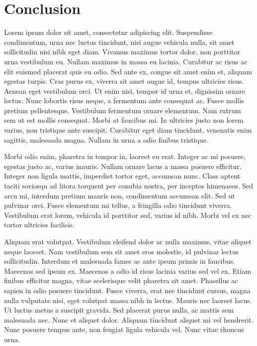 \documentclass[twocolumn]{article}
\begin{document}
	\section{Conclusion}
	
	
	Lorem ipsum dolor sit amet, consectetur adipiscing elit. Suspendisse condimentum, urna nec luctus tincidunt, nisi augue vehicula nulla, sit amet sollicitudin nisi nibh eget diam. Vivamus maximus tortor dolor, non porttitor urna vestibulum eu. Nullam maximus in massa eu lacinia. Curabitur ac risus ac elit euismod placerat quis eu odio. Sed ante ex, congue sit amet enim et, aliquam egestas turpis. Cras purus ex, viverra sit amet augue id, tempus ultricies risus. Aenean eget vestibulum orci. Ut enim nisi, tempor id urna et, dignissim ornare lectus. Nunc lobortis risus neque, a fermentum ante consequat ac. Fusce mollis pretium pellentesque. Vestibulum fermentum ornare elementum. Nam rutrum sem ut est mollis consequat. Morbi at faucibus mi. In ultricies justo non lorem varius, non tristique ante suscipit. Curabitur eget diam tincidunt, venenatis enim sagittis, malesuada magna. Nullam in urna a odio finibus tristique.
	
	Morbi odio enim, pharetra in tempor in, laoreet eu erat. Integer ac mi posuere, egestas justo ac, varius mauris. Nullam ornare lacus a massa posuere efficitur. Integer non ligula mattis, imperdiet tortor eget, accumsan nunc. Class aptent taciti sociosqu ad litora torquent per conubia nostra, per inceptos himenaeos. Sed arcu mi, interdum pretium mauris non, condimentum accumsan elit. Sed ut pulvinar orci. Fusce elementum mi tellus, a fringilla odio tincidunt viverra. Vestibulum erat lorem, vehicula id porttitor sed, varius id nibh. Morbi vel ex nec tortor ultricies facilisis.
	
	Aliquam erat volutpat. Vestibulum eleifend dolor ac nulla maximus, vitae aliquet neque laoreet. Nam vestibulum sem sit amet eros molestie, id pulvinar lectus sollicitudin. Interdum et malesuada fames ac ante ipsum primis in faucibus. Maecenas sed ipsum ex. Maecenas a odio id risus lacinia varius sed vel ex. Etiam finibus efficitur magna, vitae scelerisque velit pharetra sit amet. Phasellus ac sapien in odio posuere tincidunt. Fusce viverra, erat nec tincidunt cursus, magna nulla vulputate nisi, eget volutpat massa nibh in lectus. Mauris nec laoreet lacus. Ut luctus metus a suscipit gravida. Sed placerat purus nulla, ac mattis sem malesuada nec. Nunc et aliquet dolor. Aliquam tincidunt aliquet mi vel hendrerit. Nunc posuere tempus ante, non feugiat ligula vehicula vel. Nunc vitae rhoncus urna.
	
\end{document}
